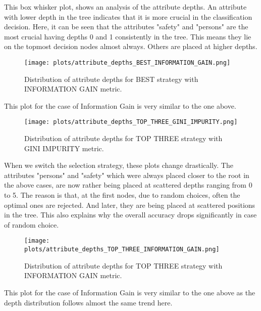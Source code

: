 \documentclass[12pt]{article}
\begin{document}
This box whisker plot, shows an analysis of the attribute depths. An attribute with lower depth in the tree indicates that it is more crucial in the classification decision. Here, it can be seen that the attributes "safety" and "persons" are the most crucial having depths 0 and 1 consistently in the tree. This means they lie on the topmost decision nodes almost always. Others are placed at higher depths.

\newpage

\begin{figure}[H]
    \centering
    \texttt{[image: plots/attribute\_depths\_BEST\_INFORMATION\_GAIN.png]}
    \caption{Distribution of attribute depths for BEST strategy with INFORMATION GAIN metric.}
    \label{fig:attr-best-ig}
\end{figure}

This plot for the case of Information Gain is very similar to the one above.

\newpage

\begin{figure}[H]
    \centering
    \texttt{[image: plots/attribute\_depths\_TOP\_THREE\_GINI\_IMPURITY.png]}
    \caption{Distribution of attribute depths for TOP THREE strategy with GINI IMPURITY metric.}
    \label{fig:attr-top3-gini}
\end{figure}

When we switch the selection strategy, these plots change drastically. The attributes "persons" and "safety" which were always placed closer to the root in the above cases, are now rather being placed at scattered depths ranging from 0 to 5. The reason is that, at the first nodes, due to random choices, often the optimal ones are rejected. And later, they are being placed at scattered positions in the tree. This also explains why the overall accuracy drops significantly in case of random choice.

\newpage

\begin{figure}[H]
    \centering
    \texttt{[image: plots/attribute\_depths\_TOP\_THREE\_INFORMATION\_GAIN.png]}
    \caption{Distribution of attribute depths for TOP THREE strategy with INFORMATION GAIN metric.}
    \label{fig:attr-top3-ig}
\end{figure}

This plot for the case of Information Gain is very similar to the one above as the depth distribution follows almost the same trend here.
\end{document}
